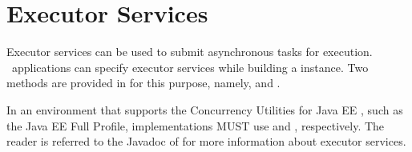 \section{Executor Services}
\label{executor_services}

Executor services can be used to submit asynchronous tasks for execution. \jaxrs\ applications can specify executor services while building a  instance. Two methods are provided in  for this purpose, namely,  and . 

In an environment that supports the Concurrency Utilities for Java EE \cite{concurrencyee}, such as the Java EE Full Profile, implementations MUST use  and , respectively. The reader is referred to the Javadoc of  for more information about executor services.

